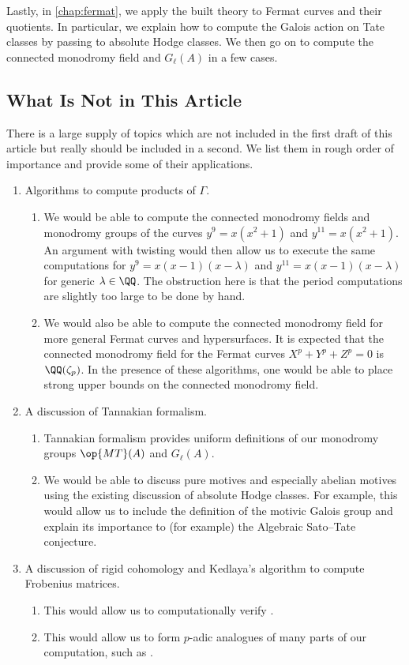 \documentclass[openany]{book}
\begin{document}
Lastly, in \cref{chap:fermat}, we apply the built theory to Fermat curves and their quotients. In particular, we explain how to compute the Galois action on Tate classes by passing to absolute Hodge classes. We then go on to compute the connected monodromy field and $G_\ell(A)$ in a few cases.

\subsection{What Is Not in This Article}
There is a large supply of topics which are not included in the first draft of this article but really should be included in a second. We list them in rough order of importance and provide some of their applications.
\begin{enumerate}
	\item Algorithms to compute products of $\Gamma$.
	\begin{enumerate}
		\item We would be able to compute the connected monodromy fields and monodromy groups of the curves $y^9=x\left(x^2+1\right)$ and $y^{11}=x\left(x^2+1\right)$. An argument with twisting would then allow us to execute the same computations for $y^9=x(x-1)(x-\lambda)$ and $y^{11}=x(x-1)(x-\lambda)$ for generic $\lambda\in\QQ$. The obstruction here is that the period computations are slightly too large to be done by hand.
		\item We would also be able to compute the connected monodromy field for more general Fermat curves and hypersurfaces. It is expected that the connected monodromy field for the Fermat curves $X^p+Y^p+Z^p=0$ is $\QQ(\zeta_p)$. In the presence of these algorithms, one would be able to place strong upper bounds on the connected monodromy field.
	\end{enumerate}
	\item A discussion of Tannakian formalism.
	\begin{enumerate}
		\item Tannakian formalism provides uniform definitions of our monodromy groups $\op{MT}(A)$ and $G_\ell(A)$.
		\item We would be able to discuss pure motives and especially abelian motives using the existing discussion of absolute Hodge classes. For example, this would allow us to include the definition of the motivic Galois group and explain its importance to (for example) the Algebraic Sato--Tate conjecture.
	\end{enumerate}
	\item A discussion of rigid cohomology and Kedlaya's algorithm to compute Frobenius matrices.
	\begin{enumerate}
		\item This would allow us to computationally verify .
		\item This would allow us to form $p$-adic analogues of many parts of our computation, such as .
	\end{enumerate}
\end{enumerate}
\end{document}
